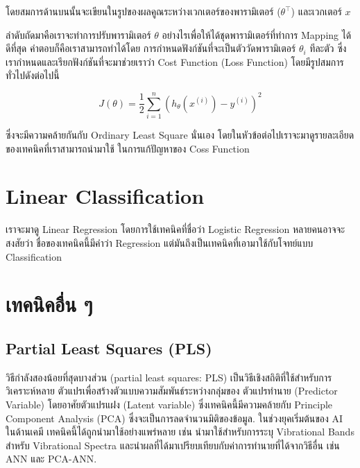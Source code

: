 \noindent โดยสมการด้านบนนั้นจะเขียนในรูปของผลคูณระหว่างเวกเตอร์ของพารามิเตอร์ ($\theta^{\top}$) และเวกเตอร์ $x$

ลำดับถัดมาคือเราจะทำการปรับพารามิเตอร์ $\theta$ อย่างไรเพื่อให้ได้ชุดพารามิเตอร์ที่ทำการ Mapping ได้ดีที่สุด คำตอบก็คือเราสามารถทำได้โดย%
การกำหนดฟังก์ชันที่จะเป็นตัววัดพารามิเตอร์ $\theta_{i}$ ทีละตัว ซึ่งเรากำหนดและเรียกฟังก์ชันที่จะมาช่วยเราว่า Cost Function (Loss Function)
โดยมีรูปสมการทั่วไปดังต่อไปนี้ 

\begin{equation}
    J(\theta) = \frac 1 2 \sum_{i=1}^n \left( h_\theta(x^{(i)}) - y^{(i)} \right)^2
\end{equation}

\noindent ซึ่งจะมีความคล้ายกันกับ Ordinary Least Square นั่นเอง โดยในหัวข้อต่อไปเราจะมาดูรายละเอียดของเทคนิคที่เราสามารถนำมาใช้%
ในการแก้ปัญหาของ Coss Function

\section{Linear Classification}

เราจะมาดู Linear Regression โดยการใช้เทคนิคที่ชื่อว่า Logistic Regression หลายคนอาจจะสงสัยว่า ชื่อของเทคนิคนี้มีคำว่า Regression 
แต่มันถึงเป็นเทคนิคที่เอามาใช้กับโจทย์แบบ Classification

\section{เทคนิคอื่น ๆ}

\subsection{Partial Least Squares (PLS)}

วิธีกำลังสองน้อยที่สุดบางส่วน (partial least squares: PLS) 
เป็นวิธีเชิงสถิติที่ใช้สำหรับการวิเคราะห์หลาย ตัวแปรเพื่อสร้างตัวแบบความสัมพันธ์ระหว่างกลุ่มของ ตัวแปรทำนาย (Predictor Variable) 
โดยอาศัยตัวแปรแฝง (Latent variable) ซึ่งเทคนิคนี้มีความคล้ายกับ Principle Component Analysis (PCA) 
ซึ่งจะเป็นการลดจำนวนมิติของข้อมูล.\cite{wold1984} ในช่วงยุคเริ่มต้นของ AI ในด้านเคมี เทคนิคนี้ได้ถูกนำมาใช้อย่างแพร่หลาย เช่น 
นำมาใช้สำหรับการระบุ Vibrational Bands สำหรับ Vibrational Spectra และนำผลที่ได้มาเปรียบเทียบกับค่าการทำนายที่ได้จากวิธีอื่น เช่น
ANN และ PCA-ANN.

